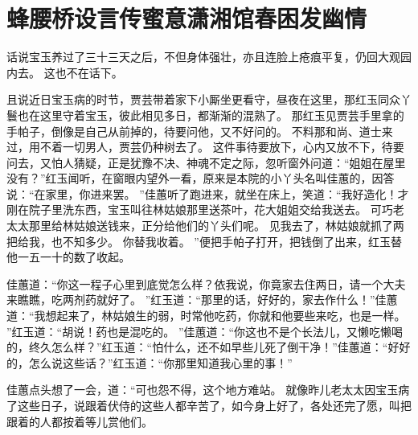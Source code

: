 \chapter{蜂腰桥设言传蜜意\quad 潇湘馆春困发幽情}
\par
话说宝玉养过了三十三天之后，不但身体强壮，亦且连脸上疮痕平复，仍回大观园内去。
这也不在话下。
\par
且说近日宝玉病的时节，贾芸带着家下小厮坐更看守，昼夜在这里，那红玉同众丫鬟也在这里守着宝玉，彼此相见多日，都渐渐的混熟了。
那红玉见贾芸手里拿的手帕子，倒像是自己从前掉的，待要问他，又不好问的。
不料那和尚、道士来过，用不着一切男人，贾芸仍种树去了。
这件事待要放下，心内又放不下，待要问去，又怕人猜疑，正是犹豫不决、神魂不定之际，忽听窗外问道：“姐姐在屋里没有？”红玉闻听，在窗眼内望外一看，原来是本院的小丫头名叫佳蕙的，因答说：“在家里，你进来罢。
”佳蕙听了跑进来，就坐在床上，笑道：“我好造化！才刚在院子里洗东西，宝玉叫往林姑娘那里送茶叶，花大姐姐交给我送去。
可巧老太太那里给林姑娘送钱来，正分给他们的丫头们呢。
见我去了，林姑娘就抓了两把给我，也不知多少。
你替我收着。
”便把手帕子打开，把钱倒了出来，红玉替他一五一十的数了收起。
\par
佳蕙道：“你这一程子心里到底觉怎么样？依我说，你竟家去住两日，请一个大夫来瞧瞧，吃两剂药就好了。
”红玉道：“那里的话，好好的，家去作什么！”佳蕙道：“我想起来了，林姑娘生的弱，时常他吃药，你就和他要些来吃，也是一样。
”红玉道：“胡说！药也是混吃的。
”佳蕙道：“你这也不是个长法儿，又懒吃懒喝的，终久怎么样？”红玉道：“怕什么，还不如早些儿死了倒干净！”佳蕙道：“好好的，怎么说这些话？”红玉道：“你那里知道我心里的事！”\par
佳蕙点头想了一会，道：“可也怨不得，这个地方难站。
就像昨儿老太太因宝玉病了这些日子，说跟着伏侍的这些人都辛苦了，如今身上好了，各处还完了愿，叫把跟着的人都按着等儿赏他们。
